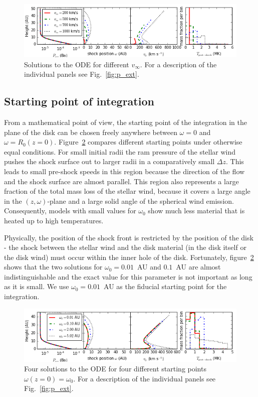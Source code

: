 \documentclass[manuscript]{aastex}
\begin{document}
\begin{figure}[h!]
\begin{center}
\includegraphics[width=1\columnwidth]{figures/v_infty/v_infty.png}
\caption{\label{fig:v_infty}
Solutions to the ODE for different $v_\infty$. For a description of the individual panels see Fig.~\ref{fig:p_ext}.}
\end{center}
\end{figure}

\subsection{Starting point of integration}
\label{sect:omega0}
From a mathematical point of view, the starting point of the integration in the plane of the disk can be chosen freely anywhere between $\omega=0$ and $\omega=R_0(z=0)$. Figure~\ref{fig:omega_0} compares different starting points under otherwise equal conditions. For small initial radii the ram pressure of the stellar wind pushes the shock surface out to larger radii in a comparatively small $\Delta z$. This leads to small pre-shock speeds in this region because the direction of the flow and the shock surface are almost parallel. This region also represents a large fraction of the total mass loss of the stellar wind, because it covers a large angle in the $(z,\omega)$-plane and a large solid angle of the spherical wind emission. Consequently, models with small values for $\omega_0$ show much less material that is heated up to high temperatures. 

Physically, the position of the shock front is restricted by the position of the disk - the shock between the stellar wind and the disk material (in the disk itself or the disk wind) must occur within the inner hole of the disk. Fortunately, figure~\ref{fig:omega_0} shows that the two solutions for $\omega_0=0.01$~AU and $0.1$~AU are almost indistinguishable and the exact value for this parameter is not important as long as it is small. We use $\omega_0 = 0.01$~AU as the fiducial starting point for the integration.

\begin{figure}[h!]
\begin{center}
\includegraphics[width=1\columnwidth]{figures/omega_0/omega_0.png}
\caption{\label{fig:omega_0}
Four solutions to the ODE for four different starting points $\omega(z=0)=\omega_0$. For a description of the individual panels see Fig.~\ref{fig:p_ext}.}
\end{center}
\end{figure}
\end{document}

